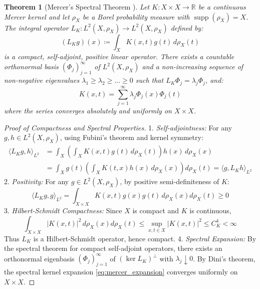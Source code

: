 \documentclass[11pt,a4paper]{article}
\newtheorem{theorem}{Theorem}[section]
\theoremstyle{definition}
\begin{document}
\begin{theorem}[Mercer's Spectral Theorem \cite{mercer1909}]\label{thm:mercer}
Let $K: X \times X \to \mathbb{R}$ be a continuous Mercer kernel and let $\rho_X$ be a Borel probability measure with $\operatorname{supp}(\rho_X) = X$.
The integral operator $L_K: L^2(X, \rho_X) \to L^2(X, \rho_X)$ defined by:
\begin{equation}\label{eq:mercer_operator}
(L_K g)(x) \coloneqq \int_X K(x, t) g(t) \, d\rho_X(t)
\end{equation}
is a compact, self-adjoint, positive linear operator.
There exists a countable orthonormal basis $(\Phi_j)_{j=1}^\infty$ of $L^2(X, \rho_X)$ and a non-increasing sequence of non-negative eigenvalues $\lambda_1 \ge \lambda_2 \ge \dots \ge 0$ such that $L_K \Phi_j = \lambda_j \Phi_j$, and:
\begin{equation}\label{eq:mercer_expansion}
K(x, t) = \sum_{j=1}^\infty \lambda_j \Phi_j(x) \Phi_j(t)
\end{equation}
where the series converges absolutely and uniformly on $X \times X$.
\end{theorem}

\begin{proof}[Proof of Compactness and Spectral Properties]
1. \emph{Self-adjointness:} For any $g, h \in L^2(X, \rho_X)$, using Fubini's theorem and kernel symmetry:
\begin{align*}
\langle L_K g, h \rangle_{L^2} &= \int_X \left( \int_X K(x, t) g(t) \, d\rho_X(t) \right) h(x) \, d\rho_X(x) \\
&= \int_X g(t) \left( \int_X K(t, x) h(x) \, d\rho_X(x) \right) d\rho_X(t) = \langle g, L_K h \rangle_{L^2}
\end{align*}
2. \emph{Positivity:} For any $g \in L^2(X, \rho_X)$, by positive semi-definiteness of $K$:
\[
\langle L_K g, g \rangle_{L^2} = \int_{X \times X} K(x, t) g(x) g(t) \, d\rho_X(x) d\rho_X(t) \ge 0
\]
3. \emph{Hilbert-Schmidt Compactness:} Since $X$ is compact and $K$ is continuous,
\[
\int_{X \times X} |K(x, t)|^2 \, d\rho_X(x) d\rho_X(t) \le \sup_{x, t \in X} |K(x, t)|^2 \le C_K^4 < \infty
\]
Thus $L_K$ is a Hilbert-Schmidt operator, hence compact.
4. \emph{Spectral Expansion:} By the spectral theorem for compact self-adjoint operators, there exists an orthonormal eigenbasis $(\Phi_j)_{j=1}^\infty$ of $(\ker L_K)^\perp$ with $\lambda_j \downarrow 0$. By Dini's theorem, the spectral kernel expansion \eqref{eq:mercer_expansion} converges uniformly on $X \times X$.
\end{proof}
\end{document}
